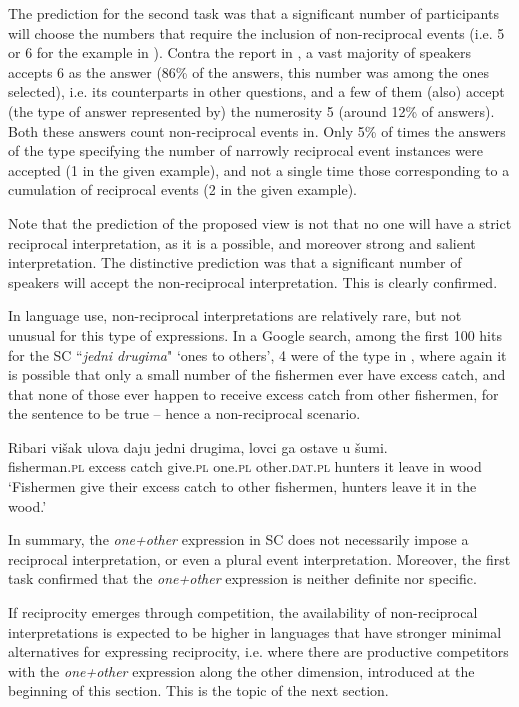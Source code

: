 \documentclass[output=paper,colorlinks,citecolor=brown]{langscibook}
\begin{document}
The prediction for the second task was that a significant number of participants will choose the numbers that require the inclusion of non-reciprocal events (i.e. 5 or 6 for the example in ). Contra the report in \citet{d08}, a vast majority of speakers accepts 6 as the answer (86\% of the answers, this number was among the ones selected), i.e. its counterparts in other questions, and a few of them (also) accept (the type of answer represented by) the
numerosity 5 (around 12\% of answers). Both these answers count non-reciprocal events in. Only 5\% of times the answers of the type specifying the number of narrowly reciprocal event instances were accepted (1 in the given example), and not a single time those corresponding to a cumulation of reciprocal events (2 in the given example). 

Note that the prediction of the proposed view is not that no one will have a strict reciprocal interpretation, as it is a possible, and moreover strong and salient interpretation. The distinctive prediction was that a significant number of speakers will accept the non-reciprocal interpretation. This is clearly confirmed.

In language use, non-reciprocal interpretations are relatively rare, but not unusual for this type of expressions. In a Google search, among the first 100 hits for the SC ``\textit{jedni drugima}" `ones to others', 4 were of the type in , where again it is possible that only a small number of the fishermen ever have excess catch, and that none of those ever happen to receive excess catch from other fishermen, for the sentence to be true -- hence a non-reciprocal scenario.

\ea\label{ex:Ribari} \gll Ribari višak ulova daju jedni drugima, lovci ga ostave u šumi.\\
 fisherman.\textsc{pl} excess catch give.\textsc{pl} one.\textsc{pl} other.\textsc{dat.\textsc{pl}} hunters it leave in wood\\
 \glt `Fishermen give their excess catch to other fishermen, hunters leave it in the wood.'
 \z

\noindent In summary, the \textit{one+other} expression in SC does not necessarily impose a reciprocal interpretation, or even a plural event interpretation. Moreover, the first task confirmed that the \textit{one+other} expression is neither definite nor specific. 

If reciprocity emerges through competition, the availability of non-reciprocal interpretations is expected to be higher in languages that have stronger minimal alternatives for expressing reciprocity, i.e. where there are productive competitors with the \textit{one+other} expression along the other dimension, introduced at the beginning of this section. This is the topic of the next section.
\end{document}
